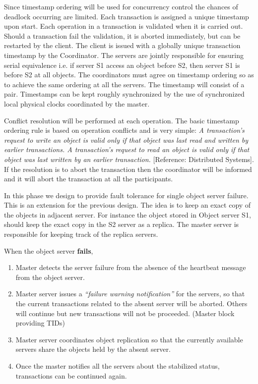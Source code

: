\documentclass[times, 10pt,twocolumn]{article}
\begin{document}
\label{subsec:dldetect}
Since timestamp ordering will be used for concurrency control the chances of deadlock occurring are limited.
Each transaction is assigned a unique timestamp upon start. Each operation in a transaction is validated when it is carried out.
Should a transaction fail the validation, it is aborted immediately, but can be restarted by the client. The client is issued with a globally unique transaction timestamp by the Coordinator. The servers are jointly responsible for ensuring serial equivalence i.e. if server S1 access an object before S2, then server S1 is before S2 at all objects. The coordinators must agree on timestamp ordering so as to achieve the same ordering at all the servers. The timestamp will consist of a {\it <local timestamp, server-id> } pair. Timestamps can be kept roughly synchronized by the use of synchronized local physical clocks coordinated by the master.

Conflict resolution will be performed at each operation.
The basic timestamp ordering rule is based on operation conflicts and is very simple:
{\it A transaction’s request to write an object is valid only if that object was last read and written by earlier transactions. A transaction’s request to read an object is valid only if that object was last written by an earlier transaction.} [Reference: Distributed Systems].
If the resolution is to abort the transaction then the coordinator will be informed and it will abort the transaction at all the participants.

\label{subsec:faultol}
In this phase we design to provide fault tolerance for single object server failure. This is an extension for the previous design. The idea is to keep an exact copy of the objects in adjacent server.
For instance the object stored in Object server S1, should keep the exact copy in the S2 server as a replica. The master server is responsible for keeping track of the replica servers.

When the object server {\bf fails},
\begin{enumerate}
\item Master detects the server failure from the absence of the heartbeat message from the object server.
\item Master server issues a {\it “failure warning notification”} for the servers, so that the current transactions related to the absent server will be aborted.
Others will continue but new transactions will not be proceeded. (Master block providing TIDs)
\item Master server coordinates object replication so that the currently available servers share the objects held by the absent server.
\item Once the master notifies all the servers about the stabilized status, transactions can be continued again.
\end{enumerate}
\end{document}

